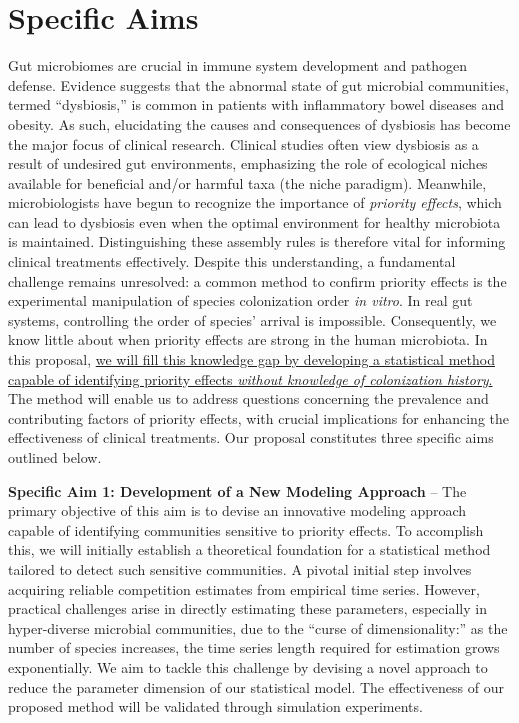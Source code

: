 \documentclass[12pt, class=article, crop=false]{standalone}
\begin{document}
\section*{Specific Aims}

Gut microbiomes are crucial in immune system development and pathogen defense.
Evidence suggests that the abnormal state of gut microbial communities, termed ``dysbiosis,'' is common in patients with inflammatory bowel diseases and obesity.
As such, elucidating the causes and consequences of dysbiosis has become the major focus of clinical research.
Clinical studies often view dysbiosis as a result of undesired gut environments, emphasizing the role of ecological niches available for beneficial and/or harmful taxa (the niche paradigm).
Meanwhile, microbiologists have begun to recognize the importance of \textit{priority effects}, which can lead to dysbiosis even when the optimal environment for healthy microbiota is maintained.
Distinguishing these assembly rules is therefore vital for informing clinical treatments effectively.
Despite this understanding, a fundamental challenge remains unresolved: a common method to confirm priority effects is the experimental manipulation of species colonization order \textit{in vitro}.
In real gut systems, controlling the order of species' arrival is impossible.
Consequently, we know little about when priority effects are strong in the human microbiota.
In this proposal, \ul{we will fill this knowledge gap by developing a statistical method capable of identifying priority effects \textit{without knowledge of colonization history}.}
The method will enable us to address questions concerning the prevalence and contributing factors of priority effects, with crucial implications for enhancing the effectiveness of clinical treatments.
Our proposal constitutes three specific aims outlined below.

\textbf{Specific Aim 1: Development of a New Modeling Approach} --
The primary objective of this aim is to devise an innovative modeling approach capable of identifying communities sensitive to priority effects.
To accomplish this, we will initially establish a theoretical foundation for a statistical method tailored to detect such sensitive communities.
A pivotal initial step involves acquiring reliable competition estimates from empirical time series. However, practical challenges arise in directly estimating these parameters, especially in hyper-diverse microbial communities, due to the ``curse of dimensionality:'' as the number of species increases, the time series length required for estimation grows exponentially.
We aim to tackle this challenge by devising a novel approach to reduce the parameter dimension of our statistical model.
The effectiveness of our proposed method will be validated through simulation experiments.
\end{document}
